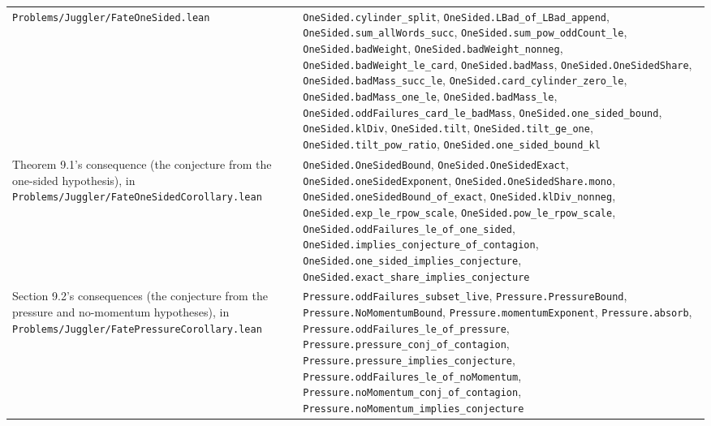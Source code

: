 \documentclass[11pt,a4paper]{article}
\begin{document}
\begin{longtable}[]{@{}
  >{\raggedright\arraybackslash}p{}
  >{\raggedright\arraybackslash}p{}@{}}
\texttt{\nolinkurl{Problems/Juggler/FateOneSided.lean}} &
\texttt{\nolinkurl{OneSided.cylinder_split}},
\texttt{\nolinkurl{OneSided.LBad_of_LBad_append}},
\texttt{\nolinkurl{OneSided.sum_allWords_succ}},
\texttt{\nolinkurl{OneSided.sum_pow_oddCount_le}},
\texttt{\nolinkurl{OneSided.badWeight}},
\texttt{\nolinkurl{OneSided.badWeight_nonneg}},
\texttt{\nolinkurl{OneSided.badWeight_le_card}},
\texttt{\nolinkurl{OneSided.badMass}},
\texttt{\nolinkurl{OneSided.OneSidedShare}},
\texttt{\nolinkurl{OneSided.badMass_succ_le}},
\texttt{\nolinkurl{OneSided.card_cylinder_zero_le}},
\texttt{\nolinkurl{OneSided.badMass_one_le}},
\texttt{\nolinkurl{OneSided.badMass_le}},
\texttt{\nolinkurl{OneSided.oddFailures_card_le_badMass}},
\texttt{\nolinkurl{OneSided.one_sided_bound}},
\texttt{\nolinkurl{OneSided.klDiv}}, \texttt{\nolinkurl{OneSided.tilt}},
\texttt{\nolinkurl{OneSided.tilt_ge_one}},
\texttt{\nolinkurl{OneSided.tilt_pow_ratio}},
\texttt{\nolinkurl{OneSided.one_sided_bound_kl}} \\
Theorem 9.1's consequence (the conjecture from the one-sided
hypothesis), in
\texttt{\nolinkurl{Problems/Juggler/FateOneSidedCorollary.lean}} &
\texttt{\nolinkurl{OneSided.OneSidedBound}},
\texttt{\nolinkurl{OneSided.OneSidedExact}},
\texttt{\nolinkurl{OneSided.oneSidedExponent}},
\texttt{\nolinkurl{OneSided.OneSidedShare.mono}},
\texttt{\nolinkurl{OneSided.oneSidedBound_of_exact}},
\texttt{\nolinkurl{OneSided.klDiv_nonneg}},
\texttt{\nolinkurl{OneSided.exp_le_rpow_scale}},
\texttt{\nolinkurl{OneSided.pow_le_rpow_scale}},
\texttt{\nolinkurl{OneSided.oddFailures_le_of_one_sided}},
\texttt{\nolinkurl{OneSided.implies_conjecture_of_contagion}},
\texttt{\nolinkurl{OneSided.one_sided_implies_conjecture}},
\texttt{\nolinkurl{OneSided.exact_share_implies_conjecture}} \\
Section 9.2's consequences (the conjecture from the pressure and
no-momentum hypotheses), in
\texttt{\nolinkurl{Problems/Juggler/FatePressureCorollary.lean}} &
\texttt{\nolinkurl{Pressure.oddFailures_subset_live}},
\texttt{\nolinkurl{Pressure.PressureBound}},
\texttt{\nolinkurl{Pressure.NoMomentumBound}},
\texttt{\nolinkurl{Pressure.momentumExponent}},
\texttt{\nolinkurl{Pressure.absorb}},
\texttt{\nolinkurl{Pressure.oddFailures_le_of_pressure}},
\texttt{\nolinkurl{Pressure.pressure_conj_of_contagion}},
\texttt{\nolinkurl{Pressure.pressure_implies_conjecture}},
\texttt{\nolinkurl{Pressure.oddFailures_le_of_noMomentum}},
\texttt{\nolinkurl{Pressure.noMomentum_conj_of_contagion}},
\texttt{\nolinkurl{Pressure.noMomentum_implies_conjecture}} \\

\end{longtable}
\end{document}
